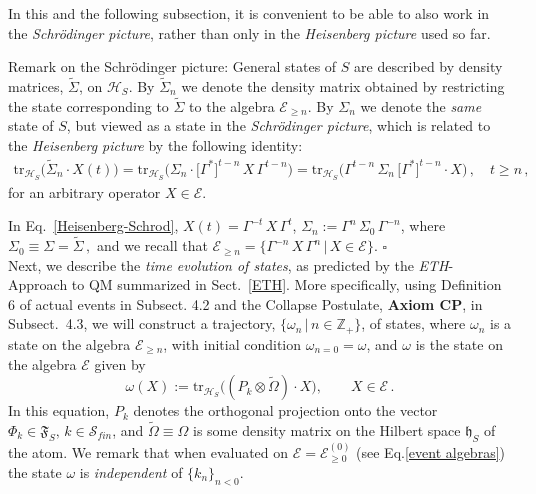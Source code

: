 \documentclass[12pt]{article}
\begin{document}
In this and the following subsection, it is convenient to be able to also work in the \textit{Schr\"odinger picture}, rather than 
only in the \textit{Heisenberg picture} used so far. 

{Remark on the Schr\"odinger picture}: General states of $S$ are described by density matrices, 
$\widetilde{\Sigma}$, on $\mathcal{H}_S$. By
$\widetilde{\Sigma}_{n}$ we denote the density matrix obtained by restricting the state corresponding to $\widetilde{\Sigma}$ to the algebra $\mathcal{E}_{\geq n}$. By 
$\Sigma_{n}$ we denote the \textit{same} state of $S$, but viewed as a state in the \textit{Schr\"odinger picture}, which is related to the \textit{Heisenberg  picture} by the following identity: 
\begin{align}\label{Heisenberg-Schrod}
\text{tr}_{\mathcal{H}_S}\big(\widetilde{\Sigma}_{n}\cdot X(t)\big) = \text{tr}_{\mathcal{H}_S} \big(\Sigma_{n}\cdot
\big[\Gamma^{*}\big]^{t-n} \,X\, \Gamma^{t-n}\big) = \text{tr}_{\mathcal{H}_S} \big(\Gamma^{t-n}\,\Sigma_{n} \,
\big[\Gamma^{*}\big]^{t-n}\cdot X\big)\,, \quad t\geq n\,,
\end{align}
for an arbitrary operator $X \in \mathcal{E}$. 

In Eq.~\eqref{Heisenberg-Schrod},  $X(t)= \Gamma^{-t} \,X\, \Gamma^{t}$, 
$\Sigma_n := \Gamma^{n}\, \Sigma_{0}\, \Gamma^{-n}$, where $\Sigma_{0}\equiv \Sigma = \widetilde{\Sigma}\,,$  and
we recall that $\mathcal{E}_{\geq n}=\big\{\Gamma^{-n}\,X\,\Gamma^{n}\,\big|\, X\in \mathcal{E}\big\}$. \hspace{10cm}
$\square$\\

Next, we describe the \textit{time evolution of states}, as predicted by the \textit{ETH}-Approach to QM summarized 
in Sect.~\ref{ETH}. More specifically, using Definition 6 of actual events in Subsect. 4.2 and the Collapse Postulate, {\bf{Axiom CP}}, in Subsect.~4.3, we will construct a trajectory, $\big\{\omega_n\, \big| \, n\in \mathbb{Z}_{+}\big\}$, 
of states, where $\omega_n$ is a state on the algebra $\mathcal{E}_{\geq n}$, with initial condition 
$\omega_{n=0}=\omega$, and $\omega$ is the state on the algebra $\mathcal{E}$ given by
\begin{equation}\label{initial cond}
\omega(X):= \text{tr}_{\mathcal{H}_S}\big((P_{{k}} \otimes \widetilde{\Omega})\cdot X\big), \qquad X\in \mathcal{E}\,.
\end{equation}
In this equation, $P_{{k}}$ denotes the orthogonal projection onto the vector 
$\Phi_{{k}} \in \mathfrak{F}_S,\,  {k}\in \mathcal{S}_{fin}$, and $\widetilde{\Omega}\equiv \Omega$ 
is some density matrix on the Hilbert space $\mathfrak{h}_S$ of the atom. 
We remark that when evaluated on $\mathcal{E}= \mathcal{E}_{\geq 0}^{(0)}$ (see Eq.\eqref{event algebras}) the state $\omega$ 
is \textit{independent} of $\{k_n\}_{n<0}$. 
\end{document}
